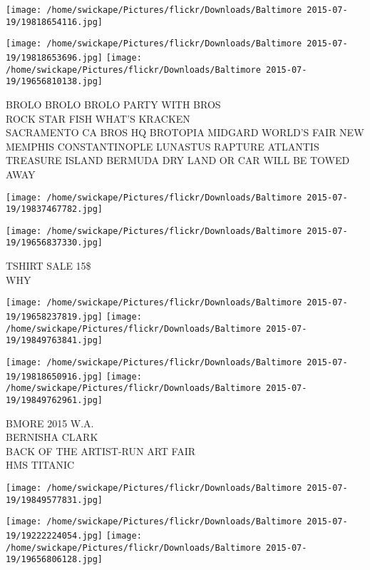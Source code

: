 \documentclass[10pt,letterpaper]{article}
\begin{document}
\texttt{[image: /home/swickape/Pictures/flickr/Downloads/Baltimore 2015-07-19/19818654116.jpg]}

\vspace{0.25in}
\texttt{[image: /home/swickape/Pictures/flickr/Downloads/Baltimore 2015-07-19/19818653696.jpg]}
\texttt{[image: /home/swickape/Pictures/flickr/Downloads/Baltimore 2015-07-19/19656810138.jpg]}

BROLO BROLO BROLO PARTY WITH BROS\\
ROCK STAR FISH WHAT'S KRACKEN\\
SACRAMENTO CA BROS HQ BROTOPIA MIDGARD WORLD'S FAIR NEW MEMPHIS CONSTANTINOPLE LUNASTUS RAPTURE ATLANTIS TREASURE ISLAND BERMUDA DRY LAND OR CAR WILL BE TOWED AWAY\\
\pagebreak

\texttt{[image: /home/swickape/Pictures/flickr/Downloads/Baltimore 2015-07-19/19837467782.jpg]}

\vspace{0.25in}
\texttt{[image: /home/swickape/Pictures/flickr/Downloads/Baltimore 2015-07-19/19656837330.jpg]}

TSHIRT SALE 15\$\\
WHY\\
\pagebreak

\texttt{[image: /home/swickape/Pictures/flickr/Downloads/Baltimore 2015-07-19/19658237819.jpg]}
\texttt{[image: /home/swickape/Pictures/flickr/Downloads/Baltimore 2015-07-19/19849763841.jpg]}

\texttt{[image: /home/swickape/Pictures/flickr/Downloads/Baltimore 2015-07-19/19818650916.jpg]}
\texttt{[image: /home/swickape/Pictures/flickr/Downloads/Baltimore 2015-07-19/19849762961.jpg]}

BMORE 2015 W.A.\\
BERNISHA CLARK\\
BACK OF THE ARTIST{-}RUN ART FAIR\\
HMS TITANIC\\
\pagebreak

\texttt{[image: /home/swickape/Pictures/flickr/Downloads/Baltimore 2015-07-19/19849577831.jpg]}

\vspace{0.25in}
\texttt{[image: /home/swickape/Pictures/flickr/Downloads/Baltimore 2015-07-19/19222224054.jpg]}
\texttt{[image: /home/swickape/Pictures/flickr/Downloads/Baltimore 2015-07-19/19656806128.jpg]}
\end{document}
